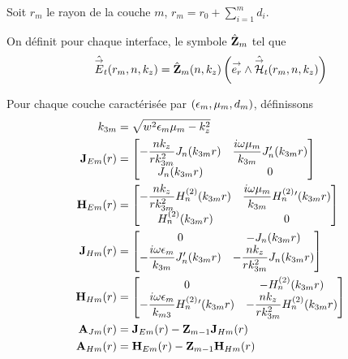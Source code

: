     \begin{figure}[!hbt]
      \centering
      \begin{tikzpicture}
        
      \end{tikzpicture}
    \end{figure}

    Soit \(r_m\) le rayon de la couche \(m\), \(r_m = r_0 +\sum_{i=1}^{m} d_{i}\).

    \begin{defn}
      On définit pour chaque interface, le symbole \(\hat \mZ_m\) tel que
      \begin{equation}
        \hat \vE_t(r_m,n,k_z) = \hat \mZ_m(n,k_z) \left(\vect{e_r} \pvect \hat \vH_t(r_m,n,k_z)\right)
      \end{equation}
    \end{defn}

    Pour chaque couche caractérisée par \((\eps_m,\mu_m,d_m)\), définissons
    \begin{subequations}
      \begin{align}
        k_{3m} &= \sqrt{w^2\eps_m\mu_m - k_z^2}
        \\
        \mJ_{Em}(r) &=
          \begin{bmatrix}
            -\frac{nk_z}{rk_{3m}^2}J_n(k_{3m}r) & \frac{i\w\mu_m}{k_{3m}}J_n'(k_{3m}r)
            \\
            J_n(k_{3m}r) & 0
          \end{bmatrix}
        \\
        \mH_{Em}(r) &=
          \begin{bmatrix}
            -\frac{nk_z}{rk_{3m}^2}H_n^{(2)}(k_{3m}r) & \frac{i\w\mu_m}{k_{3m}}H_n^{(2)}{}'(k_{3m}r)
            \\
            H_n^{(2)}(k_{3m}r) & 0
          \end{bmatrix}
        \\
        \mJ_{Hm}(r) &=
          \begin{bmatrix}
            0 & -J_n(k_{3m}r)
            \\
            -\frac{i\w\eps_m}{k_{3m}}J_n'(k_{3m}r) & -\frac{nk_z}{rk_{3m}^2}J_n(k_{3m}r)
          \end{bmatrix}
        \\
        \mH_{Hm}(r) &=
          \begin{bmatrix}
            0 & -H_n^{(2)}(k_{3m}r)
            \\
            -\frac{i\w\eps_m}{k_{m3}}H_n^{(2)}{}'(k_{3m}r) & -\frac{nk_z}{rk_{3m}^2}H_n^{(2)}(k_{3m}r)
          \end{bmatrix}
        \\
        \mA_{Jm}(r) &= \mJ_{Em}(r) -  \mZ_{m-1} \mJ_{Hm}(r)
        \\
        \mA_{Hm}(r) &= \mH_{Em}(r) -  \mZ_{m-1} \mH_{Hm}(r)
      \end{align}
    \end{subequations}

